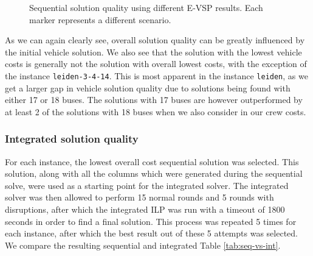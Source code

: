 \documentclass[]{article}
\begin{document}
\begin{figure}
  \caption{Sequential solution quality using different E-VSP results. Each marker represents a different scenario.}
  \label{fig:seq-solutions}
\end{figure}

As we can again clearly see, overall solution quality can be greatly influenced by the initial vehicle solution. We also see that the solution with the lowest vehicle costs is generally not the solution with overall lowest costs, with the exception of the instance \texttt{leiden-3-4-14}. This is most apparent in the instance \texttt{leiden}, as we get a larger gap in vehicle solution quality due to solutions being found with either 17 or 18 buses. The solutions with 17 buses are however outperformed by at least 2 of the solutions with 18 buses when we also consider in our crew costs. 

\subsubsection{Integrated solution quality}
For each instance, the lowest overall cost sequential solution was selected. This solution, along with all the columns which were generated during the sequential solve, were used as a starting point for the integrated solver. The integrated solver was then allowed to perform 15 normal rounds and 5 rounds with disruptions, after which the integrated ILP was run with a timeout of 1800 seconds in order to find a final solution. This process was repeated 5 times for each instance, after which the best result out of these 5 attempts was selected. We compare the resulting sequential and integrated Table \ref{tab:seq-vs-int}.
\end{document}
